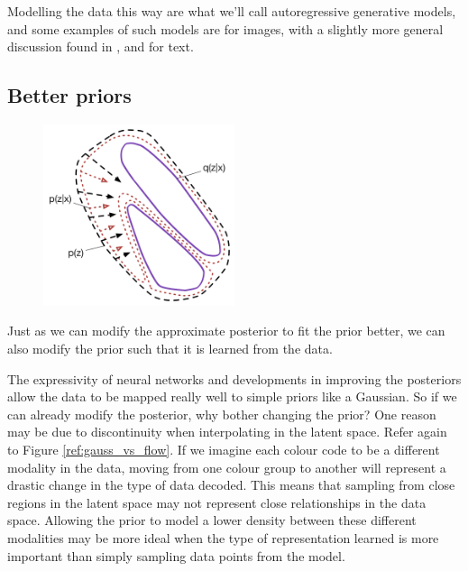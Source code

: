 \documentclass{article}
\begin{document}
Modelling the data this way are what we'll call autoregressive generative models, and some examples of such models are \cite{gulrajani2016pixelvae} for images, with a slightly more general discussion found in \cite{chen2016variational}, and \cite{bowman2015generating} for text. 



\subsection{Better priors}

\begin{figure}
\centering
\includegraphics[width=0.5\textwidth]{figures/mmp.pdf}
\label{ref:mmp}
\caption{}
\end{figure}

Just as we can modify the approximate posterior to fit the prior better, we can also modify the prior such that it is learned from the data.

The expressivity of neural networks and developments in improving the posteriors allow the data to be mapped really well to simple priors like a Gaussian. So if we can already modify the posterior, why bother changing the prior? One reason may be due to discontinuity when interpolating in the latent space. Refer again to Figure \ref{ref:gauss_vs_flow}. If we imagine each colour code to be a different modality in the data, moving from one colour group to another will represent a drastic change in the type of data decoded. This means that sampling from close regions in the latent space may not represent close relationships in the data space. Allowing the prior to model a lower density between these different modalities may be more ideal when the type of representation learned is more important than simply sampling data points from the model.
\end{document}
